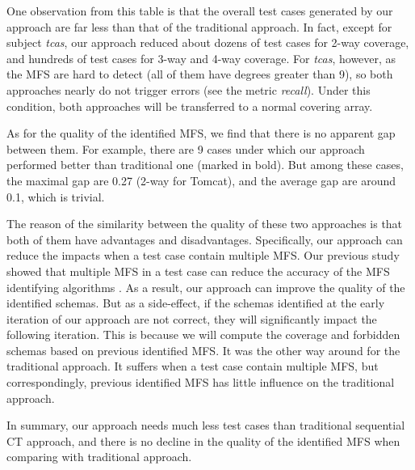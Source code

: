 \documentclass{sig-alternate}
\begin{document}
One observation from this table is that the overall test cases generated by our approach are far less than that of the traditional approach. In fact, except for subject \emph{tcas}, our approach reduced about dozens of test cases for 2-way coverage, and hundreds of test cases for 3-way and 4-way coverage. For \emph{tcas}, however, as the MFS are hard to detect (all of them have degrees greater than 9), so both approaches nearly do not trigger errors (see the metric \emph{recall}). Under this condition, both approaches will be transferred to a normal covering array.

As for the quality of the identified MFS, we find that there is no apparent gap between them. For example, there are 9 cases under which our approach performed better than traditional one (marked in bold). But among these cases, the maximal gap are  0.27 (2-way for Tomcat), and the average gap are around 0.1, which is trivial.

The reason of the similarity between the quality of these two approaches is that both of them have advantages and disadvantages. Specifically, our approach can reduce the impacts when a test case contain multiple MFS. Our previous study showed that multiple MFS in a test case can reduce the accuracy of the MFS identifying algorithms \cite{niu2013identifying}. As a result, our approach can improve the quality of the identified schemas. But as a side-effect, if the schemas identified at the early iteration of our approach are not correct, they will significantly impact the following iteration. This is because we will compute the coverage and  forbidden schemas based on previous identified MFS.  It was the other way around for the traditional approach. It suffers when a test case contain multiple MFS, but correspondingly, previous identified MFS has little influence on the traditional approach.


In summary, our approach needs much less test cases than traditional sequential CT approach, and there is no decline in the quality of the identified MFS when comparing with traditional approach.

%
%
%
\end{document}

